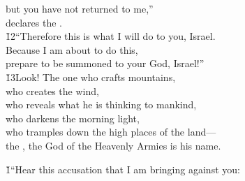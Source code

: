\begin{poetry}
\poemll    but you have not returned to me,'' \\
\poemlll       declares the . \\
\poeml \v{12}``Therefore this is what I will do to you, Israel. \\
\poemll    Because I am about to do this, \\
\poemlll       prepare to be summoned to your God, Israel!'' \\
\poeml \v{13}Look! The one who crafts mountains, \\
\poemll    who creates the wind, \\
\poeml who reveals what he is thinking to mankind, \\
\poemll    who darkens the morning light, \\
\poeml who tramples down the high places of the land--- \\
\poemll    the , the God of the Heavenly Armies is his name.
\end{poetry}

\begin{poetry}
\poeml {}
\v{1}``Hear this accusation that I am bringing against you:
\end{poetry}

